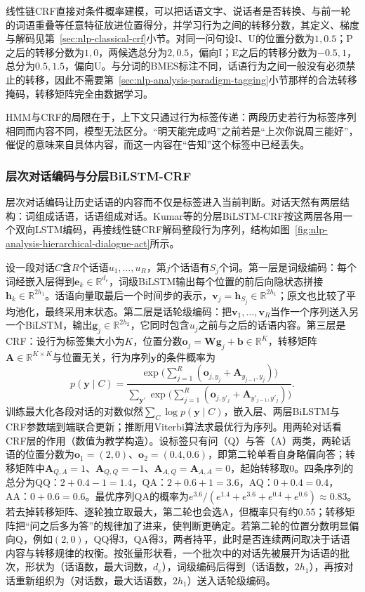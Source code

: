 线性链CRF直接对条件概率建模，可以把话语文字、说话者是否转换、与前一轮的词语重叠等任意特征放进位置得分，并学习行为之间的转移分数，其定义、梯度与解码见第~\ref{sec:nlp-classical-crf}小节。对同一问句设I、U的位置分数为$1,0.5$；P之后的转移分数为$1,0$，两候选总分为$2,0.5$，偏向I；E之后的转移分数为$-0.5,1$，总分为$0.5,1.5$，偏向U。与分词的BMES标注不同，话语行为之间一般没有必须禁止的转移，因此不需要第~\ref{sec:nlp-analysis-paradigm-tagging}小节那样的合法转移掩码，转移矩阵完全由数据学习。

HMM与CRF的局限在于，上下文只通过行为标签传递：两段历史若行为标签序列相同而内容不同，模型无法区分。“明天能完成吗”之前若是“上次你说周三能好”，催促的意味来自具体内容，而这一内容在“告知”这个标签中已经丢失。

\subsubsection{层次对话编码与分层BiLSTM-CRF}
\label{sec:nlp-analysis-dialogue-hierarchical}

层次对话编码让历史话语的内容而不仅是标签进入当前判断。对话天然有两层结构：词组成话语，话语组成对话。Kumar等的分层BiLSTM-CRF按这两层各用一个双向LSTM编码，再接线性链CRF解码整段行为序列\cite{nlp-analysis-kumar2018}，结构如图~\ref{fig:nlp-analysis-hierarchical-dialogue-act}所示。

设一段对话$C$含$R$个话语$u_1,\ldots,u_R$，第$j$个话语有$S_j$个词。第一层是词级编码：每个词经嵌入层得到$\bm e_k\in\mathbb R^{d_e}$，词级BiLSTM输出每个位置的前后向隐状态拼接$\bm h_k\in\mathbb R^{2h_1}$。话语向量取最后一个时间步的表示，$\bm v_j=\bm h_{S_j}\in\mathbb R^{2h_1}$；原文也比较了平均池化，最终采用末状态。第二层是话轮级编码：把$\bm v_1,\ldots,\bm v_R$当作一个序列送入另一个BiLSTM，输出$\bm g_j\in\mathbb R^{2h_2}$，它同时包含$u_j$之前与之后的话语内容。第三层是CRF：设行为标签集大小为$K$，位置分数$\bm o_j=\bm W\bm g_j+\bm b\in\mathbb R^{K}$，转移矩阵$\bm A\in\mathbb R^{K\times K}$与位置无关，行为序列$\bm y$的条件概率为
\begin{equation}
  p(\bm y\mid C)=\frac{\exp\bigl(\sum_{j=1}^{R}(\bm o_{j,y_j}+\bm A_{y_{j-1},y_j})\bigr)}
   {\sum_{\bm y'}\exp\bigl(\sum_{j=1}^{R}(\bm o_{j,y'_j}+\bm A_{y'_{j-1},y'_j})\bigr)}.
  \label{eq:nlp-analysis-hierarchical-crf}
\end{equation}
训练最大化各段对话的对数似然$\sum_C\log p(\bm y\mid C)$，嵌入层、两层BiLSTM与CRF参数端到端联合更新；推断用Viterbi算法求最优行为序列。用两轮对话看CRF层的作用（数值为教学构造）。设标签只有问（Q）与答（A）两类，两轮话语的位置分数为$\bm o_1=(2,0)$、$\bm o_2=(0.4,0.6)$，即第二轮单看自身略偏向答；转移矩阵中$\bm A_{Q,A}=1$、$\bm A_{Q,Q}=-1$、$\bm A_{A,Q}=\bm A_{A,A}=0$，起始转移取0。四条序列的总分为QQ：$2+0.4-1=1.4$，QA：$2+0.6+1=3.6$，AQ：$0+0.4=0.4$，AA：$0+0.6=0.6$。最优序列QA的概率为$e^{3.6}/(e^{1.4}+e^{3.6}+e^{0.4}+e^{0.6})\approx0.83$。若去掉转移矩阵、逐轮独立取最大，第二轮也会选A，但概率只有约$0.55$；转移矩阵把“问之后多为答”的规律加了进来，使判断更确定。若第二轮的位置分数明显偏向Q，例如$(2,0)$，QQ得$3$，QA得$3$，两者持平，此时是否连续两问取决于话语内容与转移规律的权衡。按张量形状看，一个批次中的对话先被展开为话语的批次，形状为（话语数，最大词数，$d_e$），词级编码后得到（话语数，$2h_1$），再按对话重新组织为（对话数，最大话语数，$2h_1$）送入话轮级编码。

